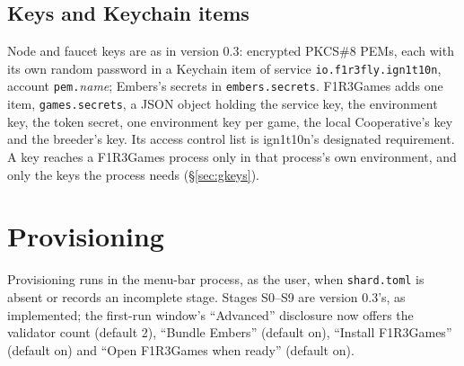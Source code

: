 \documentclass[11pt]{article}
\theoremstyle{definition}
\theoremstyle{remark}
\newcommand{\code}[1]{\texttt{#1}}
\newcommand{\Hr}{ign1t10n}
\newcommand{\Gm}{F1R3Games}
\newcommand{\Em}{Embers}
\begin{document}
\subsection{Keys and Keychain items}

Node and faucet keys are as in version 0.3: encrypted PKCS\#8 PEMs, each with its own
random password in a Keychain item of service \code{io.f1r3fly.ign1t10n}, account
\code{pem.}\textit{name}; \Em{}'s secrets in \code{embers.secrets}. \Gm{} adds one
item, \code{games.secrets}, a JSON object holding the service key, the environment
key, the token secret, one environment key per game, the local Cooperative's key and
the breeder's key. Its access control list is \Hr{}'s designated requirement. A key
reaches a \Gm{} process only in that process's own environment, and only the keys the
process needs (\S\ref{sec:gkeys}).

\section{Provisioning}\label{sec:prov}

Provisioning runs in the menu-bar process, as the user, when \code{shard.toml} is
absent or records an incomplete stage. Stages S0--S9 are version 0.3's, as
implemented; the first-run window's ``Advanced'' disclosure now offers the validator
count (default 2), ``Bundle \Em{}'' (default on), ``Install \Gm{}'' (default on) and
``Open \Gm{} when ready'' (default on).
\end{document}
